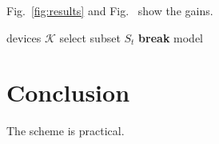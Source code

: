 \documentclass[conference]{IEEEtran}
\begin{document}
Fig.~\ref{fig:results} and Fig.~ show the gains.

\begin{algorithmic}[1]
\REQUIRE devices $\mathcal{K}$
\STATE select subset $S_t$
\STATE \textbf{break}
\ENDIF
\ENDFOR
\RETURN model
\end{algorithmic}

\section{Conclusion}
The scheme is practical.



\end{document}
